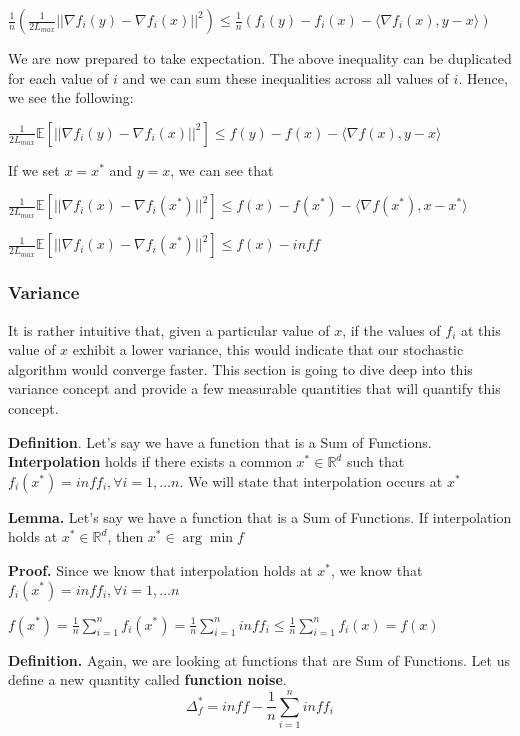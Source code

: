$\frac{1}{n} (\frac{1}{2L_{max}} ||\nabla f_i(y) - \nabla f_i(x)||^2) \leq \frac{1}{n} (f_i(y) - f_i(x) - \langle \nabla f_i(x), y - x \rangle)$ \newline 

We are now prepared to take expectation. The above inequality can be duplicated for each value of $i$ and we can sum these inequalities across all values of $i$. Hence, we see the following: \newline 

$\frac{1}{2L_{max}} \mathbb{E}[||\nabla f_i(y) - \nabla f_i(x)||^2] \leq f(y) - f(x) - \langle \nabla f(x), y - x \rangle$

If we set $x = x^*$ and $y = x$, we can see that 

$\frac{1}{2L_{max}} \mathbb{E}[||\nabla f_i(x) - \nabla f_i(x^*)||^2] \leq f(x) - f(x^*) - \langle \nabla f(x^*), x - x^* \rangle$ \newline 

$\frac{1}{2L_{max}} \mathbb{E}[||\nabla f_i(x) - \nabla f_i(x^*)||^2] \leq f(x) - inf f$


\subsubsection{Variance}
It is rather intuitive that, given a particular value of $x$, if the values of $f_i$ at this value of $x$ exhibit a lower variance, this would indicate that our stochastic algorithm would converge faster. This section is going to dive deep into this variance concept and provide a few measurable quantities that will quantify this concept. 

\noindent \textbf{Definition}. Let's say we have a function that is a Sum of Functions. \textbf{Interpolation} holds if there exists a common $x^* \in \mathbb{R}^d$ such that $f_i(x^*) = inf f_i, \forall i = 1, \dots n$. We will state that interpolation occurs at $x^*$

\noindent \textbf{Lemma.} Let's say we have a function that is a Sum of Functions. If interpolation holds at $x^* \in \mathbb{R}^d$, then $x^* \in \arg \min f$

\noindent \textbf{Proof.} 
Since we know that interpolation holds at $x^*$, we know that $f_i(x^*) = inf f_i, \forall i = 1, \dots n$

$f(x^*) = \frac{1}{n} \sum_{i=1}^{n} f_i(x^*) = \frac{1}{n} \sum_{i=1}^{n} inf f_i \leq \frac{1}{n} \sum_{i=1}^{n} f_i(x) = f(x)$

\noindent \textbf{Definition.} Again, we are looking at functions that are Sum of Functions. Let us define a new quantity called \textbf{function noise}. 
\begin{equation}
    \Delta^*_f = inf f - \frac{1}{n} \sum_{i=1}^{n} inf f_i
\end{equation}

